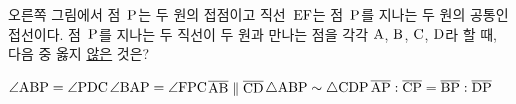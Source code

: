 \noindent\begin{minipage}[t]{0.58\linewidth}\vspace{0pt}\raggedright 오른쪽 그림에서 점~$\mathrm{P}$는 두 원의 접점이고 직선~$\mathrm{EF}$는 점~$\mathrm{P}$를 지나는 두 원의 공통인 접선이다. 점~$\mathrm{P}$를 지나는 두 직선이 두 원과 만나는 점을 각각 $\mathrm{A}$, $\mathrm{B}$, $\mathrm{C}$, $\mathrm{D}$라 할 때, 다음 중 옳지 \underline{않은} 것은?\end{minipage}\hfill\begin{minipage}[t]{0.4\linewidth}\vspace{0pt}\centering \resizebox{\ifdim\width>\linewidth\linewidth\else\width\fi}{!}{}\end{minipage}\par
\begin{choicesv}{$\angle\mathrm{ABP}=\angle\mathrm{PDC}$}{$\angle\mathrm{BAP}=\angle\mathrm{FPC}$}{$\overline{\mathrm{AB}}\parallel\overline{\mathrm{CD}}$}{$\triangle\mathrm{ABP}\sim\triangle\mathrm{CDP}$}{$\overline{\mathrm{AP}}:\overline{\mathrm{CP}}=\overline{\mathrm{BP}}:\overline{\mathrm{DP}}$}\end{choicesv}
